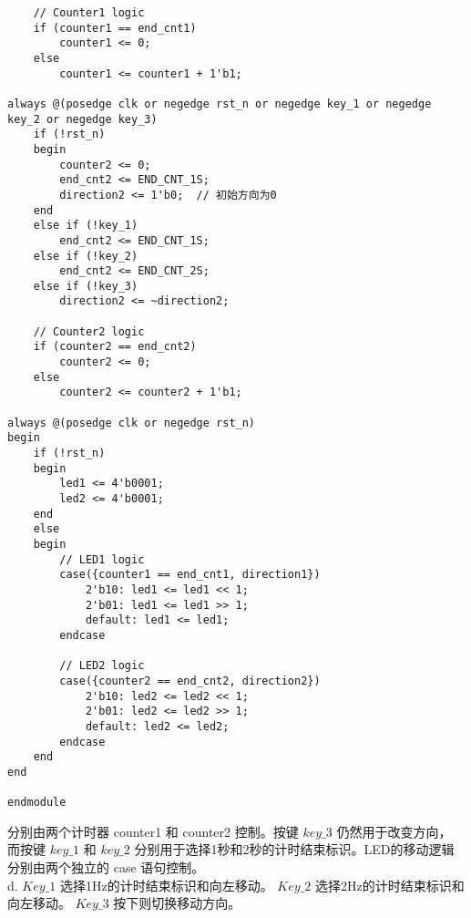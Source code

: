 \documentclass[12pt, a4paper, oneside]{article}
\begin{document}
\begin{spacing}{2.0}
\begin{lstlisting}
    // Counter1 logic
    if (counter1 == end_cnt1)
        counter1 <= 0;
    else
        counter1 <= counter1 + 1'b1;

always @(posedge clk or negedge rst_n or negedge key_1 or negedge key_2 or negedge key_3)
    if (!rst_n)
    begin
        counter2 <= 0;
        end_cnt2 <= END_CNT_1S;
        direction2 <= 1'b0;  // 初始方向为0
    end
    else if (!key_1)
        end_cnt2 <= END_CNT_1S;
    else if (!key_2)
        end_cnt2 <= END_CNT_2S;
    else if (!key_3)
        direction2 <= ~direction2;

    // Counter2 logic
    if (counter2 == end_cnt2)
        counter2 <= 0;
    else
        counter2 <= counter2 + 1'b1;

always @(posedge clk or negedge rst_n)
begin
    if (!rst_n)
    begin
        led1 <= 4'b0001;
        led2 <= 4'b0001;
    end
    else
    begin
        // LED1 logic
        case({counter1 == end_cnt1, direction1})
            2'b10: led1 <= led1 << 1;
            2'b01: led1 <= led1 >> 1;
            default: led1 <= led1;
        endcase

        // LED2 logic
        case({counter2 == end_cnt2, direction2})
            2'b10: led2 <= led2 << 1;
            2'b01: led2 <= led2 >> 1;
            default: led2 <= led2;
        endcase
    end
end

endmodule
\end{lstlisting}
分别由两个计时器 counter1 和 counter2 控制。按键 $key\_3$ 仍然用于改变方向，
而按键 $key\_1$ 和 $key\_2$ 分别用于选择1秒和2秒的计时结束标识。LED的移动逻辑分别由两个独立的 case 语句控制。\\
d.
$Key\_1$ 选择1Hz的计时结束标识和向左移动。
$Key\_2$ 选择2Hz的计时结束标识和向左移动。
$Key\_3$ 按下则切换移动方向。























\end{spacing}{}
%
%
\end{document}
